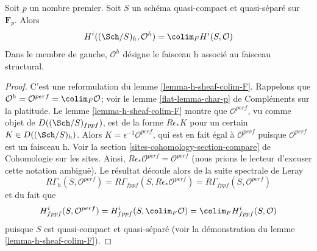 \begin{proposition}
\label{proposition-h-cohomology-structure-sheaf}
Soit $p$ un nombre premier. Soit $S$ un schéma quasi-compact et quasi-séparé
sur $\mathbf{F}_p$. Alors
$$
H^i((\Sch/S)_h, \mathcal{O}^h) =
\colim_F H^i(S, \mathcal{O})
$$
Dans le membre de gauche, $\mathcal{O}^h$ désigne
le faisceau h associé au faisceau structural.
\end{proposition}

\begin{proof}
C'est une reformulation du lemme \ref{lemma-h-sheaf-colim-F}.
Rappelons que
$\mathcal{O}^h = \mathcal{O}^{perf} = \colim_F \mathcal{O}$; voir le
lemme \ref{flat-lemma-char-p} de Compléments sur la platitude.
Le lemme \ref{lemma-h-sheaf-colim-F} montre que
$\mathcal{O}^{perf}$, vu comme objet de $D((\Sch/S)_{fppf})$,
est de la forme $R\epsilon_*K$ pour un certain $K \in D((\Sch/S)_h)$.
Alors $K = \epsilon^{-1}\mathcal{O}^{perf}$, qui est en fait
égal à $\mathcal{O}^{perf}$ puisque $\mathcal{O}^{perf}$ est un faisceau h. Voir la
section \ref{sites-cohomology-section-compare} de Cohomologie sur les sites.
Ainsi, $R\epsilon_*\mathcal{O}^{perf} = \mathcal{O}^{perf}$
(nous prions le lecteur d'excuser cette notation ambiguë).
Le résultat découle alors de la suite spectrale de Leray
$$
R\Gamma_h(S, \mathcal{O}^{perf}) =
R\Gamma_{fppf}(S, R\epsilon_*\mathcal{O}^{perf}) =
R\Gamma_{fppf}(S, \mathcal{O}^{perf})
$$
et du fait que
$$
H^i_{fppf}(S, \mathcal{O}^{perf}) =
H^i_{fppf}(S, \colim_F \mathcal{O}) =
\colim_F H^i_{fppf}(S, \mathcal{O})
$$
puisque $S$ est quasi-compact et quasi-séparé
(voir la démonstration du lemme \ref{lemma-h-sheaf-colim-F}).
\end{proof}


















